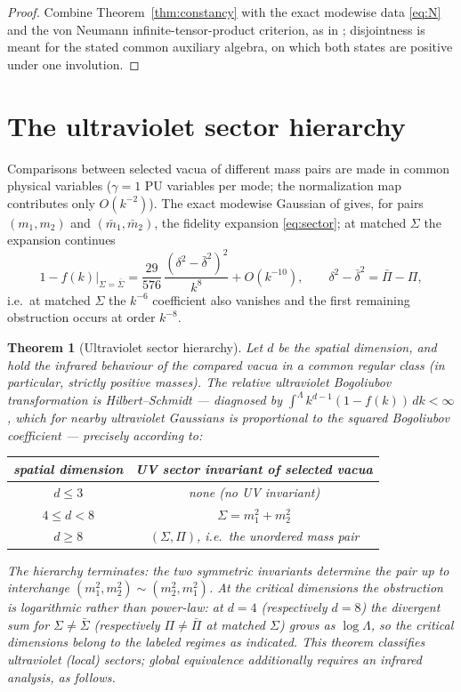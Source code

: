 \documentclass[11pt]{article}
\newtheorem{theorem}{Theorem}[section]
\theoremstyle{definition}
\theoremstyle{remark}
\begin{document}
\begin{proof}
Combine Theorem~\ref{thm:constancy} with the exact modewise data
\eqref{eq:N} and the von Neumann infinite-tensor-product criterion, as in
\cite{companion2}; disjointness is meant for the stated common auxiliary
algebra, on which both states are positive under one involution.
\end{proof}

\section{The ultraviolet sector hierarchy}\label{sec:sectors}

Comparisons between selected vacua of different mass pairs are made in
common physical variables ($\gamma=1$ PU variables per mode; the
normalization map contributes only $O(k^{-2})$).  The exact modewise
Gaussian of \cite{companion2} gives, for pairs $(m_1,m_2)$ and
$(\bar m_1,\bar m_2)$, the fidelity expansion \eqref{eq:sector}; at
matched $\Sigma$ the expansion continues
\begin{equation}\label{eq:sector8}
1-f(k)\Big|_{\Sigma=\bar\Sigma}
=\frac{29}{576}\,\frac{(\delta^2-\bar\delta^2)^2}{k^{8}}+O(k^{-10}),
\qquad \delta^2-\bar\delta^2=\bar\Pi-\Pi ,
\end{equation}
i.e.\ at matched $\Sigma$ the $k^{-6}$ coefficient also vanishes and the
first remaining obstruction occurs at order $k^{-8}$.

\begin{theorem}[Ultraviolet sector hierarchy]\label{thm:sectors}
Let $d$ be the spatial dimension, and hold the infrared behaviour of the
compared vacua in a common regular class (in particular, strictly
positive masses).  The relative ultraviolet Bogoliubov transformation is
Hilbert--Schmidt --- diagnosed by
$\int^\Lambda k^{d-1}(1-f(k))\,dk<\infty$, which for nearby ultraviolet
Gaussians is proportional to the squared Bogoliubov coefficient ---
precisely according to:
\begin{center}
\begin{tabular}{c|c}
spatial dimension & UV sector invariant of selected vacua\\
\hline
$d\le3$ & none (no UV invariant)\\
$4\le d<8$ & $\Sigma=m_1^2+m_2^2$\\
$d\ge8$ & $(\Sigma,\Pi)$, i.e.\ the unordered mass pair
\end{tabular}
\end{center}
The hierarchy terminates: the two symmetric invariants determine the
pair up to interchange $(m_1^2,m_2^2)\sim(m_2^2,m_1^2)$.
At the critical dimensions the obstruction is logarithmic rather than
power-law: at $d=4$ (respectively $d=8$) the divergent sum for
$\Sigma\neq\bar\Sigma$ (respectively $\Pi\neq\bar\Pi$ at matched
$\Sigma$) grows as $\log\Lambda$, so the critical dimensions belong to
the labeled regimes as indicated.  This theorem classifies ultraviolet
(local) sectors; global equivalence additionally requires an infrared
analysis, as follows.
\end{theorem}
\end{document}
